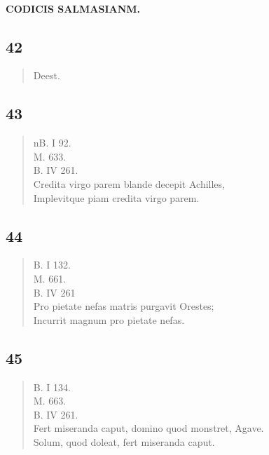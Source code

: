 \documentclass[11pt, a4paper]{report}
\begin{document}
            
        ﻿\pagebreak 
    
            \begin{center} \textbf{CODICIS SALMASIANM.} \end{center}
             \marginpar{[103]} 
            \subsection*{42}
      \begin{verse}
      Deest. \\ 
      \end{verse}
  
            \subsection*{43}
      \begin{verse}
      nB. I 92. \\ M. 633. \\ B. IV 261. \\ Credita virgo parem blande decepit Achilles, \\ Implevitque piam credita virgo parem. \\ 
      \end{verse}
  
            \subsection*{44}
      \begin{verse}
      B. I 132. \\ M. 661. \\ B. IV 261 \\ Pro pietate nefas matris purgavit Orestes; \\ Incurrit magnum pro pietate nefas. \\ 
      \end{verse}
  
            \subsection*{45}
      \begin{verse}
      B. I 134. \\ M. 663. \\ B. IV 261. \\ Fert miseranda caput, domino quod monstret, Agave. \\ Solum, quod doleat, fert miseranda caput. \\ 
      \end{verse}
  
\end{document}
